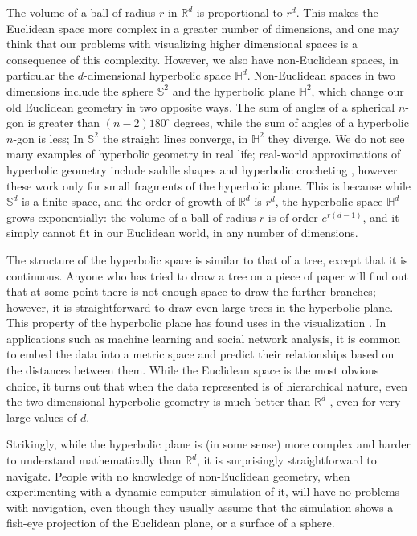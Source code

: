 \documentclass{article}
\begin{document}
The volume of a ball of radius $r$ in $\mathbb{R}^d$ is proportional
to $r^d$. This makes the Euclidean space more complex in a greater
number of dimensions, and one may think that our problems with visualizing
higher dimensional spaces is a consequence of this complexity.
However, we also have non-Euclidean spaces, in particular the
$d$-dimensional hyperbolic space $\mathbb{H}^d$. Non-Euclidean spaces in two
dimensions include the sphere $\mathbb{S}^2$ and the hyperbolic plane
$\mathbb{H}^2$, which change our old Euclidean geometry in two opposite ways.
The sum of angles of a spherical $n$-gon is greater than $(n-2)180^\circ$
degrees, while the sum of angles of a hyperbolic $n$-gon is less; 
In $\mathbb{S}^2$ the straight lines converge, in $\mathbb{H}^2$ they diverge.
We do not see many examples of hyperbolic geometry in real life; 
real-world approximations of hyperbolic geometry include saddle shapes
and hyperbolic crocheting \cite{taimina}, however these work only for small
fragments of the hyperbolic plane. This is because while $\mathbb{S}^d$ is
a finite space, and the order of growth of $\mathbb{R}^d$ is $r^d$, the
hyperbolic space $\mathbb{H}^d$ grows exponentially: the volume of a ball
of radius $r$ is of order $e^{r(d-1)}$, and it simply cannot fit in our
Euclidean world, in any number of dimensions.

The structure of the hyperbolic space is similar to that of a tree, except
that it is continuous. Anyone who has tried to draw a tree on a piece of
paper will find out that at some point there is not enough space to draw
the further branches; however, it is straightforward to draw even large
trees in the hyperbolic plane. This property of the hyperbolic plane 
has found uses in the visualization \cite{Munzner,hyptree}. 
In applications such as
machine learning and social network analysis, it is common 
to embed the data into a metric space and predict their relationships
based on the distances between them. While the Euclidean space is the
most obvious choice, it turns out that 
when the data represented is of hierarchical nature, even
the two-dimensional hyperbolic geometry is much better than $\mathbb{R}^d$
\cite{papa,hsom}, even for very large values of $d$. %

Strikingly, while the hyperbolic plane is (in some sense) more complex 
and harder to understand mathematically than $\mathbb{R}^d$, it 
is surprisingly straightforward to navigate. People with no knowledge of
non-Euclidean geometry, when experimenting with a dynamic computer simulation
of it\cite{hyperrogue}, will have no problems with navigation, even though
they usually assume that the simulation shows a fish-eye projection of the
Euclidean plane, or a surface of a sphere. 
\end{document}
